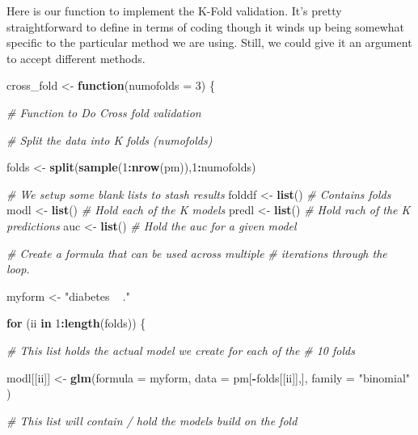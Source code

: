 \documentclass[
]{book}
\newenvironment{Shaded}{\begin{snugshade}}{\end{snugshade}}
\newcommand{\CommentTok}[1]{\textcolor[rgb]{0.56,0.35,0.01}{\textit{#1}}}
\newcommand{\ControlFlowTok}[1]{\textcolor[rgb]{0.13,0.29,0.53}{\textbf{#1}}}
\newcommand{\DataTypeTok}[1]{\textcolor[rgb]{0.13,0.29,0.53}{#1}}
\newcommand{\DecValTok}[1]{\textcolor[rgb]{0.00,0.00,0.81}{#1}}
\newcommand{\KeywordTok}[1]{\textcolor[rgb]{0.13,0.29,0.53}{\textbf{#1}}}
\newcommand{\NormalTok}[1]{#1}
\newcommand{\OperatorTok}[1]{\textcolor[rgb]{0.81,0.36,0.00}{\textbf{#1}}}
\newcommand{\StringTok}[1]{\textcolor[rgb]{0.31,0.60,0.02}{#1}}
\begin{document}
Here is our function to implement the K-Fold validation. It's pretty straightforward to define in terms of coding though it winds up being somewhat specific to the particular method we are using. Still, we could give it an argument to accept different methods.

\begin{Shaded}
\begin{Highlighting}[]
\NormalTok{cross_fold <-}\StringTok{ }\ControlFlowTok{function}\NormalTok{(}\DataTypeTok{numofolds =} \DecValTok{3}\NormalTok{) \{}
  
  \CommentTok{# Function to Do Cross fold validation}
  
  \CommentTok{# Split the data into K folds (numofolds)}
  
\NormalTok{  folds <-}\StringTok{ }\KeywordTok{split}\NormalTok{(}\KeywordTok{sample}\NormalTok{(}\DecValTok{1}\OperatorTok{:}\KeywordTok{nrow}\NormalTok{(pm)),}\DecValTok{1}\OperatorTok{:}\NormalTok{numofolds) }
  
  \CommentTok{# We setup some blank lists to stash results}
\NormalTok{  folddf    <-}\StringTok{ }\KeywordTok{list}\NormalTok{()  }\CommentTok{# Contains folds}
\NormalTok{  modl      <-}\StringTok{ }\KeywordTok{list}\NormalTok{()  }\CommentTok{# Hold each of the K models}
\NormalTok{  predl     <-}\StringTok{ }\KeywordTok{list}\NormalTok{()  }\CommentTok{# Hold rach of the K predictions}
\NormalTok{  auc       <-}\StringTok{ }\KeywordTok{list}\NormalTok{()  }\CommentTok{# Hold the auc for a given model}
  
  \CommentTok{# Create a formula that can be used across multiple}
  \CommentTok{# iterations through the loop. }
  
\NormalTok{  myform <-}\StringTok{ "diabetes ~ ."}
  
  \ControlFlowTok{for}\NormalTok{ (ii }\ControlFlowTok{in} \DecValTok{1}\OperatorTok{:}\KeywordTok{length}\NormalTok{(folds)) \{}
    
    \CommentTok{# This list holds the actual model we create for each of the }
    \CommentTok{# 10 folds}
    
\NormalTok{    modl[[ii]] <-}\StringTok{ }\KeywordTok{glm}\NormalTok{(}\DataTypeTok{formula =}\NormalTok{ myform, }
                      \DataTypeTok{data =}\NormalTok{ pm[}\OperatorTok{-}\NormalTok{folds[[ii]],],}
                      \DataTypeTok{family =} \StringTok{"binomial"}
\NormalTok{    )}
    
    \CommentTok{# This list will contain / hold the models build on the fold}
    

\end{Highlighting}
\end{Shaded}
\end{document}
